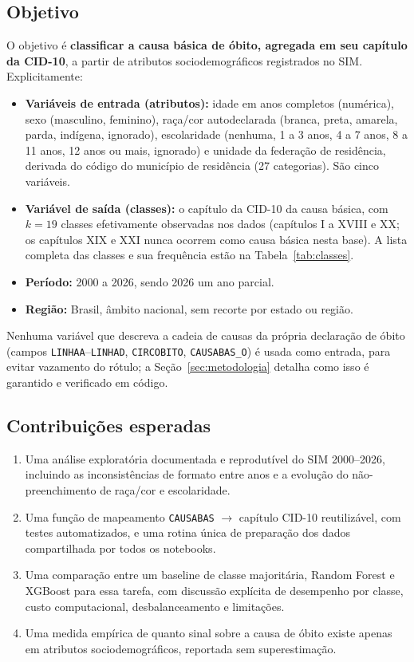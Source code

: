 \documentclass[12pt]{article}
\begin{document}
\subsection{Objetivo}

O objetivo é \textbf{classificar a causa básica de óbito, agregada em seu
capítulo da CID-10}, a partir de atributos sociodemográficos registrados no
SIM. Explicitamente:

\begin{itemize}
  \item \textbf{Variáveis de entrada (atributos):} idade em anos completos
    (numérica), sexo (masculino, feminino), raça/cor autodeclarada (branca,
    preta, amarela, parda, indígena, ignorado), escolaridade (nenhuma, 1 a 3
    anos, 4 a 7 anos, 8 a 11 anos, 12 anos ou mais, ignorado) e unidade da
    federação de residência, derivada do código do município de residência
    (27 categorias). São cinco variáveis.
  \item \textbf{Variável de saída (classes):} o capítulo da CID-10 da causa
    básica, com $k = 19$ classes efetivamente observadas nos dados (capítulos
    I a XVIII e XX; os capítulos XIX e XXI nunca ocorrem como causa básica
    nesta base). A lista completa das classes e sua frequência estão na
    Tabela~\ref{tab:classes}.
  \item \textbf{Período:} 2000 a 2026, sendo 2026 um ano parcial.
  \item \textbf{Região:} Brasil, âmbito nacional, sem recorte por estado ou
    região.
\end{itemize}

Nenhuma variável que descreva a cadeia de causas da própria declaração de
óbito (campos \texttt{LINHAA}--\texttt{LINHAD}, \texttt{CIRCOBITO},
\texttt{CAUSABAS\_O}) é usada como entrada, para evitar vazamento do rótulo;
a Seção~\ref{sec:metodologia} detalha como isso é garantido e verificado em
código.

\subsection{Contribuições esperadas}

\begin{enumerate}
  \item Uma análise exploratória documentada e reprodutível do SIM 2000--2026,
    incluindo as inconsistências de formato entre anos e a evolução do
    não-preenchimento de raça/cor e escolaridade.
  \item Uma função de mapeamento \texttt{CAUSABAS} $\rightarrow$ capítulo
    CID-10 reutilizável, com testes automatizados, e uma rotina única de
    preparação dos dados compartilhada por todos os notebooks.
  \item Uma comparação entre um baseline de classe majoritária, Random Forest
    e XGBoost para essa tarefa, com discussão explícita de desempenho por
    classe, custo computacional, desbalanceamento e limitações.
  \item Uma medida empírica de quanto sinal sobre a causa de óbito existe
    apenas em atributos sociodemográficos, reportada sem superestimação.
\end{enumerate}
\end{document}
